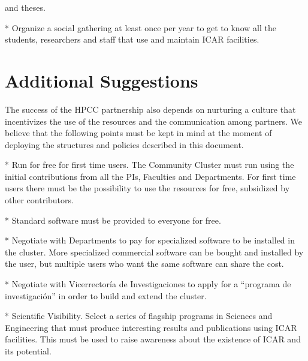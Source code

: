 \documentclass{article}
\begin{document}
and theses.

* Organize a social gathering at least once per year to get to know all the students, researchers and staff that use and maintain ICAR facilities.

\section{Additional Suggestions}

The success of the HPCC partnership also depends on nurturing a culture that incentivizes the use of the resources and the communication among partners. We believe that the following points must be kept in mind at the moment of deploying the structures and policies described in this document.

* Run for free for first time users. The Community Cluster must run using the initial contributions from all the PIs, Faculties and Departments. For first time users there must be the possibility to use the resources for free, subsidized by other contributors.

* Standard software must be provided to everyone for free.

* Negotiate with Departments to pay for specialized software to be installed in the cluster. More specialized commercial software can be bought and installed by the user, but multiple users who want the same software can share the cost.

* Negotiate with Vicerrectoría de Investigaciones to apply for a “programa de investigación” in order to build and extend the cluster.

* Scientific Visibility. Select a series of flagship programs in Sciences and Engineering that must produce interesting results and publications using ICAR facilities. This must be used to raise awareness about the existence of ICAR and its potential.
\end{document}
